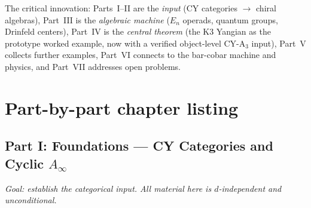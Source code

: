 \documentclass[11pt]{article}
\newcommand{\En}{E_n}
\newcommand{\Ainf}{A_\infty}
\begin{document}
The critical innovation: Parts~I--II are the \emph{input}
(CY categories $\to$ chiral algebras), Part~III is the
\emph{algebraic machine} ($\En$ operads, quantum groups,
Drinfeld centers), Part~IV is the \emph{central theorem}
(the K3 Yangian as the prototype worked example, now with a
verified object-level CY-A$_3$ input), Part~V collects further examples, Part~VI
connects to the bar-cobar machine and physics, and Part~VII
addresses open problems.

\section{Part-by-part chapter listing}

\subsection{Part I: Foundations --- CY Categories and Cyclic $\Ainf$}
\label{sec:part-i}

\textit{Goal: establish the categorical input. All material here is
$d$-independent and unconditional.}
\end{document}
